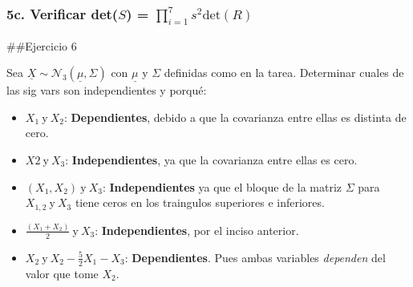 \documentclass[]{article}
\newenvironment{Shaded}{\begin{snugshade}}{\end{snugshade}}
\newcommand{\CommentTok}[1]{\textcolor[rgb]{0.56,0.35,0.01}{\textit{#1}}}
\newcommand{\ControlFlowTok}[1]{\textcolor[rgb]{0.13,0.29,0.53}{\textbf{#1}}}
\newcommand{\DataTypeTok}[1]{\textcolor[rgb]{0.13,0.29,0.53}{#1}}
\newcommand{\DecValTok}[1]{\textcolor[rgb]{0.00,0.00,0.81}{#1}}
\newcommand{\KeywordTok}[1]{\textcolor[rgb]{0.13,0.29,0.53}{\textbf{#1}}}
\newcommand{\NormalTok}[1]{#1}
\newcommand{\OperatorTok}[1]{\textcolor[rgb]{0.81,0.36,0.00}{\textbf{#1}}}
\newcommand{\StringTok}[1]{\textcolor[rgb]{0.31,0.60,0.02}{#1}}
\providecommand{\tightlist}{%
  \setlength{\itemsep}{0pt}\setlength{\parskip}{0pt}}
\begin{document}
\hypertarget{c.-verificar-dets-prod_i17s2-textdetr}{%
\subsubsection{\texorpdfstring{5c. Verificar det(\(S\)) =
\(\prod_{i=1}^{7}s^{2} \text{det}(R)\)}{5c. Verificar det(S) = \textbackslash prod\_\{i=1\}\^{}\{7\}s\^{}\{2\} \textbackslash text\{det\}(R)}}\label{c.-verificar-dets-prod_i17s2-textdetr}}

\begin{Shaded}
\end{Shaded}

\#\#Ejercicio 6

Sea \(\underline{X} \sim \mathcal{N}_{3}(\underline{\mu},\Sigma)\) con
\(\underline{\mu}\) y \(\Sigma\) definidas como en la tarea. Determinar
cuales de las sig vars son independientes y porqué:

\begin{itemize}
\tightlist
\item
  \(X_{1} \ \text{y} \ X_{2}\): \textbf{Dependientes}, debido a que la
  covarianza entre ellas es distinta de cero.
\item
  \(X{2} \ \text{y} \ X_{3}\): \textbf{Independientes}, ya que la
  covarianza entre ellas es cero.
\item
  \((X_{1},X_{2}) \ \text{y} \ X_{3}\): \textbf{Independientes} ya que
  el bloque de la matriz \(\Sigma\) para \(X_{1,2} \ \text{y} \  X_{3}\)
  tiene ceros en los traingulos superiores e inferiores.
\item
  \(\frac{(X_{1} +X_{2})}{2} \ \text{y} \ X_{3}\):
  \textbf{Independientes}, por el inciso anterior.
\item
  \(X_{2} \ \text{y} \ X_{2} - \frac{5}{2}X_{1} - X_{3}\):
  \textbf{Dependientes}. Pues ambas variables \emph{dependen} del valor
  que tome \(X_{2}\).
\end{itemize}
\end{document}
